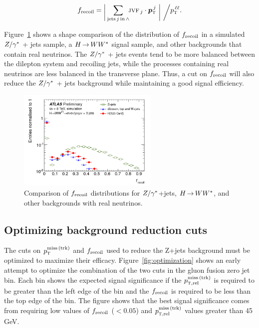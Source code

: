 \begin{equation}
\frecoil = \raisebox{-3pt}{\bigg|} \sum_{{\rm jets\,}j{\rm\,in\,}\wedge}
           \no\jvf_{\,j}\cdot\vpTjet
           ~\raisebox{-3pt}{\bigg|}
           ~\raisebox{-3pt}{\bigg/} \pTll.
\label{eqn:frecoil}
\end{equation}

Figure~\ref{fig:frecoil} shows a shape comparison of the distribution of $f_{\rm recoil}$ in a simulated $Z/\gamma^{\ast}$ + jets sample, a $H{\,{\rightarrow}\,}WW^\ast$ signal sample, and other backgrounds that contain real neutrinos. The $Z/\gamma^{\ast}$ + jets events tend to be more balanced between the dilepton system and recoiling jets, while the processes containing real neutrinos are less balanced in the transverse plane. Thus, a cut on $f_{\rm recoil}$ will also reduce the $Z/\gamma^{\ast}$ + jets background while maintaining a good signal efficiency. 

\begin{figure}[h!]
  \centering
  \captionsetup{justification=centering}

  \includegraphics[width=0.6\textwidth]{figures/frecoil}
  \caption{Comparison of $f_{\rm recoil}$ distributions for $Z/\gamma^{\ast}$+jets, $H{\,{\rightarrow}\,}WW^\ast$, and other backgrounds with real neutrinos.}
  \label{fig:frecoil}
\end{figure}

\subsection{Optimizing background reduction cuts}

The cuts on $p_{\textrm{\footnotesize\sc t}}^{\rm miss\,(trk)}$ and $f_{\rm recoil}$ used to reduce the Z+jets background must be optimized to maximize their efficacy. Figure~\ref{fig:optimization} shows an early attempt to optimize the combination of the two cuts in the gluon fusion zero jet bin. Each bin shows the expected signal significance if the $p_{{\textrm{\footnotesize\sc t}},{\rm rel}}^{\rm miss\,(trk)}$ is required to be greater than the left edge of the bin and the $f_{\rm recoil}$ is required to be less than the top edge of the bin. The figure shows that the best signal significance comes from requiring low values of $f_{\rm recoil}$ ($< 0.05$) and $p_{{\textrm{\footnotesize\sc t}},{\rm rel}}^{\rm miss\,(trk)}$  values greater than 45 GeV. 


